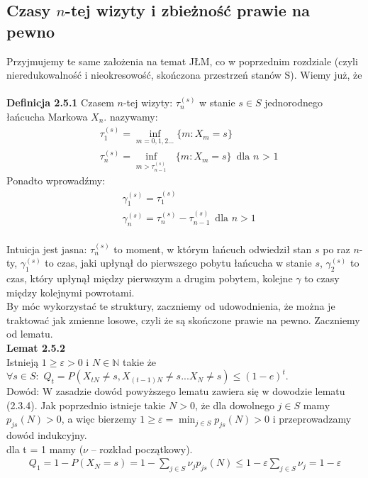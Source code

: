 \documentclass[a4paper]{article}
\begin{document}
\subsection{Czasy $n$-tej wizyty i zbieżność prawie na pewno}
Przyjmujemy te same założenia na temat JŁM, co w poprzednim rozdziale (czyli nieredukowalność i nieokresowość, skończona przestrzeń stanów S). Wiemy już, że \\
\\
\textbf{Definicja 2.5.1} 
Czasem $n$-tej wizyty:  $\tau_n^{(s)}$  w stanie $s \in S$ jednorodnego łańcucha Markowa $X_n$. nazywamy:\\
\begin{align*}
&\tau_1^{(s)} = \inf_{m = 0,1,2...} \{m: X_m = s\}\\
&\tau_n^{(s)} = \inf_{m > \tau_{n-1}^{(s)}} \,\,\,\,\{m: X_m = s\} \,\,\, \text{dla $n$ > 1}
\end{align*}
Ponadto wprowadźmy:
\begin{align*}
    &\gamma_1^{(s)} = \tau_1^{(s)}\\
    &\gamma_n^{(s)} = \tau_n^{(s)} - \tau_{n-1}^{(s)}\,\,\,\text{dla $n > 1$}
\end{align*}
\\
Intuicja jest jasna: $\tau_n^{(s)}$ to moment, w którym łańcuch odwiedził stan $s$ po raz $n$-ty, $\gamma_1^{(s)}$ to czas, jaki upłynął do pierwszego pobytu łańcucha w stanie $s$, $\gamma_2^{(s)}$ to czas, który upłynął między pierwszym a drugim pobytem, kolejne $\gamma$ to czasy między kolejnymi powrotami.\\
By móc wykorzystać te struktury, zaczniemy od udowodnienia, że można je traktować jak zmienne losowe, czyli że są skończone prawie na pewno. Zaczniemy od lematu. \\
\textbf{Lemat 2.5.2}
\\ Istnieją $1 \geq \varepsilon > 0$ i $N \in \mathbb{N}$ takie że $\forall s \in S: \,\, Q_t = P(X_{tN} \neq s, X_{(t-1)N} \neq s ... X_N \neq s) \leq (1-e)^t$.\\
Dowód: W zasadzie dowód powyższego lematu zawiera się w dowodzie lematu (2.3.4). Jak poprzednio istnieje takie $N > 0$, że dla dowolnego $j \in S$ mamy $p_{js}(N) > 0$, a więc bierzemy $1 \geq \varepsilon = \min_{j \in S} p_{js}(N) > 0$ i przeprowadzamy dowód indukcyjny.\\
dla t = 1 mamy ($\nu$ – rozkład początkowy).\\
\begin{align*}
Q_1 = 1 - P(X_N = s) = 1 - \sum _{j \in S} \nu_jp_{js}(N) \leq 1 - \varepsilon \sum _{j \in S} \nu_j = 1 - \varepsilon
\end{align*}
\end{document}
